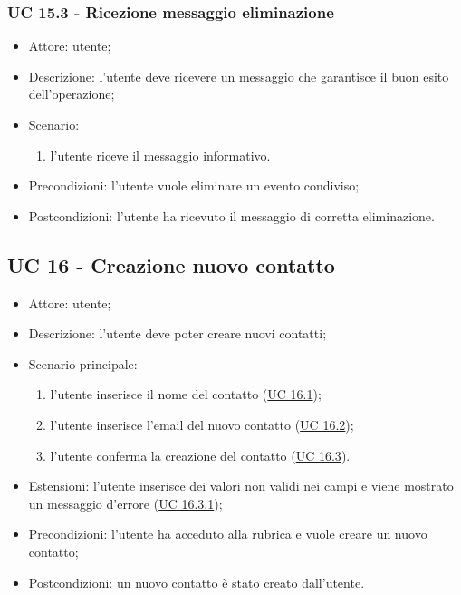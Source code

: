\subsubsection{UC 15.3 - Ricezione messaggio eliminazione} \label{sec: UC 15.3}
\begin{itemize}
    \item Attore: utente;
    \item Descrizione: l'utente deve ricevere un messaggio che garantisce il buon esito dell'operazione;
    \item Scenario:
        \begin{enumerate}
        \item l'utente riceve il messaggio informativo.
        \end{enumerate}
    
    \item Precondizioni: l'utente vuole eliminare un evento condiviso;
    \item Postcondizioni: l'utente ha ricevuto il messaggio di corretta eliminazione.
\end{itemize}




\subsection{UC 16 - Creazione nuovo contatto}
\begin{itemize}
    \item Attore: utente;
    \item Descrizione: l'utente deve poter creare nuovi contatti;
    \item Scenario principale:
        \begin{enumerate}
        \item l'utente inserisce il nome del contatto (\hyperref[sec: UC 16.1]{UC 16.1});
        \item l'utente inserisce l'email del nuovo contatto (\hyperref[sec: UC 16.2]{UC 16.2});
        \item l'utente conferma la creazione del contatto (\hyperref[sec: UC 16.3]{UC 16.3}).
        \end{enumerate}
    \item Estensioni: l'utente inserisce dei valori non validi nei campi e viene mostrato un messaggio d'errore (\hyperref[sec: UC 16.3.1]{UC 16.3.1});
    \item Precondizioni: l'utente ha acceduto alla rubrica e vuole creare un nuovo contatto;
    \item Postcondizioni: un nuovo contatto è stato creato dall'utente.
\end{itemize}


